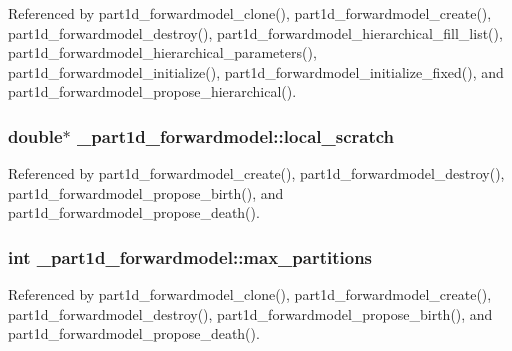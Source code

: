 Referenced by part1d\+\_\+forwardmodel\+\_\+clone(), part1d\+\_\+forwardmodel\+\_\+create(), part1d\+\_\+forwardmodel\+\_\+destroy(), part1d\+\_\+forwardmodel\+\_\+hierarchical\+\_\+fill\+\_\+list(), part1d\+\_\+forwardmodel\+\_\+hierarchical\+\_\+parameters(), part1d\+\_\+forwardmodel\+\_\+initialize(), part1d\+\_\+forwardmodel\+\_\+initialize\+\_\+fixed(), and part1d\+\_\+forwardmodel\+\_\+propose\+\_\+hierarchical().

\subsubsection[{\texorpdfstring{local\+\_\+scratch}{local_scratch}}]{\setlength{\rightskip}{0pt plus 5cm}double$\ast$ \+\_\+part1d\+\_\+forwardmodel\+::local\+\_\+scratch}\hypertarget{struct__part1d__forwardmodel_ae6d9de256a99543ea1c339564c4bd6b4}{}\label{struct__part1d__forwardmodel_ae6d9de256a99543ea1c339564c4bd6b4}


Referenced by part1d\+\_\+forwardmodel\+\_\+create(), part1d\+\_\+forwardmodel\+\_\+destroy(), part1d\+\_\+forwardmodel\+\_\+propose\+\_\+birth(), and part1d\+\_\+forwardmodel\+\_\+propose\+\_\+death().

\subsubsection[{\texorpdfstring{max\+\_\+partitions}{max_partitions}}]{\setlength{\rightskip}{0pt plus 5cm}int \+\_\+part1d\+\_\+forwardmodel\+::max\+\_\+partitions}\hypertarget{struct__part1d__forwardmodel_ab12d44e555fdbd5540d84d3c12e4806c}{}\label{struct__part1d__forwardmodel_ab12d44e555fdbd5540d84d3c12e4806c}


Referenced by part1d\+\_\+forwardmodel\+\_\+clone(), part1d\+\_\+forwardmodel\+\_\+create(), part1d\+\_\+forwardmodel\+\_\+destroy(), part1d\+\_\+forwardmodel\+\_\+propose\+\_\+birth(), and part1d\+\_\+forwardmodel\+\_\+propose\+\_\+death().

